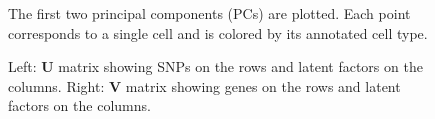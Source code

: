\documentclass{bmcart}
\begin{document}
\begin{figure}%
\centering
\caption{ The first two principal components (PCs) are plotted. Each point corresponds to a single cell and is colored by its annotated cell type.}
\label{fig:pancreas_pca_plot}
\end{figure}

\begin{figure}%
\centering
\caption{ Left: $\mathbf{U}$ matrix showing SNPs on the rows and latent factors on the columns. Right: $\mathbf{V}$ matrix showing genes on the rows and latent factors on the columns.}
\label{fig:heatmap_fig_prrr}
\end{figure}


\end{document}
